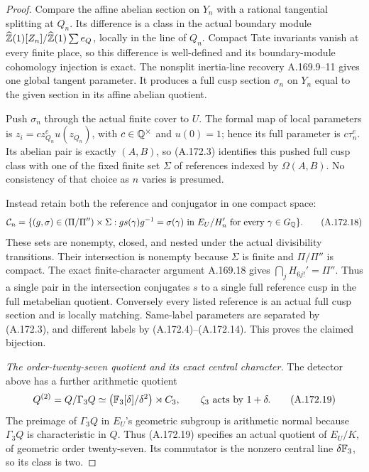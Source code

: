 \begin{proof}
Compare the affine abelian section on \(Y_n\) with a rational
tangential splitting at \(Q_n\).  Its difference is a class
in the actual boundary module
\(\widehat{\mathbb Z}(1)[Z_n]/\widehat{\mathbb Z}(1)\sum e_Q\), locally
in the line of \(Q_n\).  Compact Tate invariants vanish at
every finite place, so this difference is well-defined and its
boundary-module cohomology injection is exact.  The nonsplit
inertia-line recovery A.169.9--11 gives one global tangent
parameter.  It produces a full cusp section \(\sigma_n\)
on \(Y_n\) equal to the given section in its affine abelian
quotient.

Push \(\sigma_n\) through the actual finite cover to \(U\).
The formal map of local parameters is
\(z_i=c z_{Q_n}^{e}u(z_{Q_n})\), with \(c\in\mathbb Q^\times\)
and \(u(0)=1\); hence its full parameter is
\(c\tau_n^e\).  Its abelian pair is exactly \((A,B)\),
so (A.172.3) identifies this pushed full cusp class with one of
the fixed finite set \(\Sigma\) of references indexed by
\(\Omega(A,B)\).  No consistency of that choice as \(n\)
varies is presumed.

Instead retain both the reference and conjugator in one compact
space:
\[
 \mathcal C_n=\{(g,\sigma)\in(\Pi/\Pi'')\times\Sigma:
       g s(\gamma)g^{-1}=\sigma(\gamma)
       \text{ in }E_U/H_n'\text{ for every }\gamma\in G_\mathbb Q\}.
\tag{A.172.18}
\]
These sets are nonempty, closed, and nested under the actual
divisibility transitions.  Their intersection is nonempty because
\(\Sigma\) is finite and \(\Pi/\Pi''\) is compact.
The exact finite-character argument A.169.18 gives
\(\bigcap_jH_{6j!}'=\Pi''\).  Thus a single pair in the
intersection conjugates \(s\) to a single full reference cusp
in the full metabelian quotient.  Conversely every listed reference
is an actual full cusp section and is locally matching.  Same-label
parameters are separated by (A.172.3), and different labels by
(A.172.4)--(A.172.14).  This proves the claimed bijection.

\emph{The order-twenty-seven quotient and its exact central character.}
The detector above has a further arithmetic quotient
\[
 Q^{(2)}=Q/\Gamma_3Q
     \simeq\bigl(\mathbb F_3[\delta]/\delta^2\bigr)\rtimes C_3,
          \qquad \zeta_3\ \text{acts by }1+\delta.
\tag{A.172.19}
\]
The preimage of \(\Gamma_3Q\) in \(E_U\)'s geometric subgroup
is arithmetic normal because \(\Gamma_3Q\) is characteristic
in \(Q\).  Thus (A.172.19) specifies an actual quotient of
\(E_U/K\), of geometric order twenty-seven.  Its commutator is
the nonzero central line \(\delta\mathbb F_3\), so its class is two.


\end{proof}
